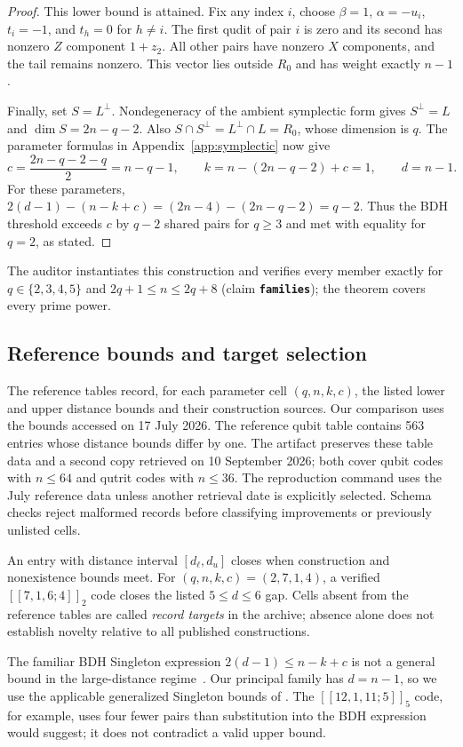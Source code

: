 \documentclass{article}
\newcommand{\claim}[1]{\textbf{\texttt{#1}}}   %
\begin{document}
\begin{proof}
This lower bound is attained. Fix any index $i$, choose
$\beta=1$, $\alpha=-u_i$, $t_i=-1$, and $t_h=0$ for $h\ne i$.
The first qudit of pair $i$ is zero and its second has nonzero
$Z$ component $1+z_2$. All other pairs have nonzero $X$ components,
and the tail remains nonzero. This vector lies outside $R_0$ and
has weight exactly $n-1$.

Finally, set $S=L^\perp$. Nondegeneracy of the ambient symplectic
form gives $S^\perp=L$ and $\dim S=2n-q-2$. Also
$S\cap S^\perp=L^\perp\cap L=R_0$, whose dimension is $q$.
The parameter formulas in Appendix~\ref{app:symplectic} now give
\[
 c=\frac{2n-q-2-q}{2}=n-q-1,\qquad
 k=n-(2n-q-2)+c=1,\qquad d=n-1.
\]
For these parameters,
$2(d-1)-(n-k+c)=(2n-4)-(2n-q-2)=q-2$.
Thus the BDH threshold exceeds $c$ by $q-2$ shared pairs for $q\ge3$
and met with equality for $q=2$, as stated.
\end{proof}
The auditor instantiates this construction and verifies every member
exactly for $q\in\{2,3,4,5\}$ and $2q+1\le n\le 2q+8$ (claim
\claim{families}); the theorem covers every prime power.

\subsection{Reference bounds and target selection}\label{app:tables}
The reference tables record, for each parameter cell $(q,n,k,c)$,
the listed lower and upper distance bounds and their construction sources.
Our comparison uses the bounds accessed on 17 July 2026. The reference
qubit table contains 563 entries whose distance bounds differ by one. The artifact
preserves these table data and a second copy retrieved on 10 September
2026; both cover qubit codes with $n\le64$ and qutrit codes with $n\le36$.
The reproduction command uses the July reference data unless another
retrieval date is explicitly selected. Schema checks reject malformed
records before classifying improvements or previously unlisted cells.

An entry with distance interval $[d_\ell,d_u]$ closes when construction
and nonexistence bounds meet. For $(q,n,k,c)=(2,7,1,4)$, a verified
$[[7,1,6;4]]_2$ code closes the listed $5\le d\le6$ gap.
Cells absent from the reference tables are called \emph{record targets} in the
archive; absence alone does not establish novelty relative to all
published constructions.

The familiar BDH Singleton expression $2(d-1)\le n-k+c$ is not a
general bound in the large-distance regime~\citep{Grassl2021}. Our
principal family has $d=n-1$, so we use the applicable generalized
Singleton bounds of \citet{GHW2022}. The $[[12,1,11;5]]_5$ code,
for example, uses four fewer pairs than substitution into the BDH
expression would suggest; it does not contradict a valid upper bound.
\end{document}
